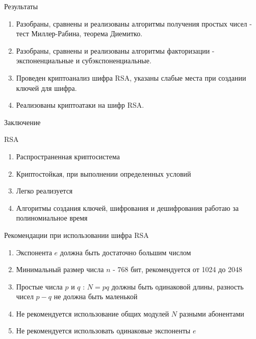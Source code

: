 
\begin{frame}{Результаты}
	\begin{center}
		\begin{enumerate}
			\item Разобраны, сравнены и реализованы алгоритмы получения простых чисел - тест Миллер-Рабина, теорема Диемитко. \vspace{0.5cm}
			\item Разобраны, сравнены и реализованы алгоритмы факторизации - экспоненциальные и субэкспоненциальные. \vspace{0.5cm}
			\item Проведен криптоанализ шифра RSA, указаны слабые места при создании ключей для шифра. \vspace{0.5cm}
			\item Реализованы криптоатаки на шифр RSA.
		\end{enumerate}
	\end{center}
\end{frame}

\begin{frame}{Заключение}

	\changefontsizes{8pt}

	\begin{center}		

		\begin{block}{RSA}
			\begin{enumerate}
				\item Распространенная криптосистема
				\item Криптостойкая, при выполнении определенных условий
				\item Легко реализуется
				\item Алгоритмы создания ключей, шифрования и дешифрования работаю за полиномиальное время
			\end{enumerate}	
		\end{block}

		\begin{block}{Рекомендации при использовании шифра RSA}
			\begin{enumerate}
				\item Экспонента $e$ должна быть достаточно большим числом
				\item Минимальный размер числа $n$ - 768 бит, рекомендуется от 1024 до 2048
				\item Простые числа $p$ и $q$ : $N=pq$ должны быть одинаковой длины, разность чисел $p - q$ не должна быть маленькой
				\item Не рекомендуется использование общих модулей $N$ разными абонентами
				\item Не рекомендуется использовать одинаковые экспоненты $e$
			\end{enumerate}	
		\end{block}
	\end{center}

	\changefontsizes{13pt}

\end{frame}
